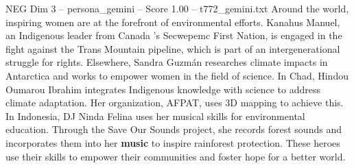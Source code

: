 \begin{textsample}{NEG Dim 3 – persona\_gemini – Score 1.00 – t772\_gemini.txt}  \label{ex:f3_neg_018}
Around the world, inspiring women are at the forefront of environmental efforts.
Kanahus Manuel, an Indigenous leader from Canada 's Secwepemc First Nation, is engaged in the fight against the Trans Mountain pipeline, which is part of an intergenerational struggle for rights.
Elsewhere, Sandra Guzmán researches climate impacts in Antarctica and works to empower women in the field of science.
In Chad, Hindou Oumarou Ibrahim integrates Indigenous knowledge with science to address climate adaptation.
Her organization, AFPAT, uses 3D mapping to achieve this.
In Indonesia, DJ Ninda Felina uses her musical skills for environmental education.
Through the Save Our Sounds project, she records forest sounds and incorporates them into her \textbf{music} to inspire rainforest protection.
These heroes use their skills to empower their communities and foster hope for a better world.

\end{textsample}
